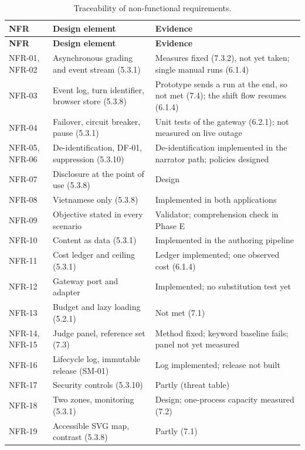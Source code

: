 {\small
\begin{longtable}{|>{\raggedright\arraybackslash}p{}|>{\raggedright\arraybackslash}p{}|>{\raggedright\arraybackslash}p{}|}
\caption{Traceability of non-functional requirements.} \\
\hline
\textbf{NFR} & \textbf{Design element} & \textbf{Evidence} \\ \hline
\endfirsthead
\hline
\textbf{NFR} & \textbf{Design element} & \textbf{Evidence} \\ \hline
\endhead
NFR-01, NFR-02 & Asynchronous grading and event stream (5.3.1) & Measures fixed (7.3.2), not yet taken; single manual runs (6.1.4) \\ \hline
NFR-03 & Event log, turn identifier, browser store (5.3.8) & Prototype sends a run at the end, so not met (7.4); the shift flow resumes (6.1.4) \\ \hline
NFR-04 & Failover, circuit breaker, pause (5.3.1) & Unit tests of the gateway (6.2.1); not measured on live outage \\ \hline
NFR-05, NFR-06 & De-identification, DF-01, suppression (5.3.10) & De-identification implemented in the narrator path; policies designed \\ \hline
NFR-07 & Disclosure at the point of use (5.3.8) & Design \\ \hline
NFR-08 & Vietnamese only (5.3.8) & Implemented in both applications \\ \hline
NFR-09 & Objective stated in every scenario & Validator; comprehension check in Phase E \\ \hline
NFR-10 & Content as data (5.3.1) & Implemented in the authoring pipeline \\ \hline
NFR-11 & Cost ledger and ceiling (5.3.1) & Ledger implemented; one observed cost (6.1.4) \\ \hline
NFR-12 & Gateway port and adapter & Implemented; no substitution test yet \\ \hline
NFR-13 & Budget and lazy loading (5.2.1) & Not met (7.1) \\ \hline
NFR-14, NFR-15 & Judge panel, reference set (7.3) & Method fixed; keyword baseline fails; panel not yet measured \\ \hline
NFR-16 & Lifecycle log, immutable release (SM-01) & Log implemented; release not built \\ \hline
NFR-17 & Security controls (5.3.10) & Partly (threat table) \\ \hline
NFR-18 & Two zones, monitoring (5.3.1) & Design; one-process capacity measured (7.2) \\ \hline
NFR-19 & Accessible SVG map, contrast (5.3.8) & Partly (7.1) \\ \hline
\end{longtable}
}
